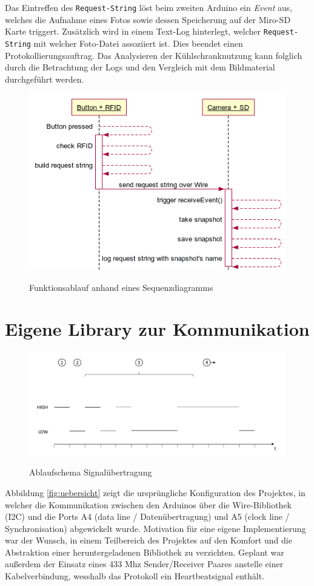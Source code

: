 \documentclass[a4paper, 11pt]{article}
\begin{document}
\noindent Das Eintreffen des \texttt{Request-String} löst beim zweiten Arduino ein \textit{Event} aus, welches die Aufnahme eines Fotos sowie dessen Speicherung auf der Miro-SD Karte triggert. Zusätzlich wird in einem Text-Log hinterlegt, welcher \texttt{Request-String} mit welcher Foto-Datei assoziiert ist. Dies beendet einen Protokollierungsauftrag. Das Analysieren der Kühlschranknutzung kann folglich durch die Betrachtung der Logs und den Vergleich mit dem Bildmaterial durchgeführt werden. 

\begin{figure}[htb]
\centering
    {\includegraphics[width=.9\textwidth]{sequenz1.png}}
    \caption{Funktionsablauf anhand eines Sequenzdiagramms\label{fig:sequenz}}
\centering
\end{figure}


\section{Eigene Library zur Kommunikation}
\begin{figure}[htb]
    \centering
        {\includegraphics[width=1\textwidth]{signal.pdf}}
        \caption{Ablaufschema Signalübertragung \label{fig:signal}}
    \centering
\end{figure}
Abbildung \ref{fig:uebersicht} zeigt die ursprüngliche Konfiguration des Projektes, in welcher die Kommunikation zwischen den Arduinos über die Wire-Bibliothek (I2C) und die Ports A4 (data line / Datenübertragung) und A5 (clock line / Synchronisation) abgewickelt wurde. Motivation für eine eigene Implementierung war der Wunsch, in einem Teilbereich des Projektes auf den Komfort und die Abstraktion einer heruntergeladenen Bibliothek zu verzichten. Geplant war außerdem der Einsatz eines 433 Mhz Sender/Receiver Paares anstelle einer Kabelverbindung, wesshalb das Protokoll ein Heartbeatsignal enthält.
\end{document}
